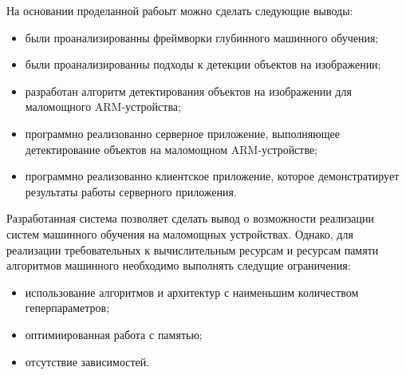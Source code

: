 \documentclass[a4paper,english,russian]{G2-105}
\begin{document}
\newpage
{} \ttl
\par На основании проделанной рабоыт можно сделать следующие выводы:
\begin{itemize}
\item были проанализированны фреймворки глубинного машинного обучения;
\item были проанализированны подходы к детекции объектов на изображении;
\item разработан алгоритм детектирования объектов на изображении для маломощного ARM-устройства;
\item программно реализованно серверное приложение, выполняющее детектирование объектов на маломощном ARM-устройстве;
\item программно реализованно клиентское приложение, которое демонстратирует результаты работы серверного приложения.
\end{itemize}
\par Разработанная система позволяет сделать вывод о возможности реализации систем машинного обучения на маломощных устройствах. Однако, для реализации требовательных к вычислительным ресурсам и ресурсам памяти алгоритмов машинного необходимо выполнять следущие ограничения:
\begin{itemize}
\item использование алгоритмов и архитектур с наименьшим количеством геперпараметров;
\item оптимиированная работа с памятью;
\item отсутствие зависимостей.
\end{itemize}
\newpage
\end{document}
